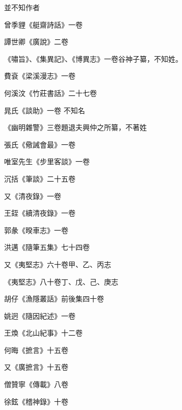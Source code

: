 \begin{pinyinscope}
 並不知作者



 曾季貍《艇齋詩話》一卷



 譚世卿《廣說》二卷



 《嘯旨》、《集異記》、《博異志》一卷谷神子纂，不知姓。



 費袞《梁溪漫志》一卷



 何溪汶《竹莊書話》二十七卷



 晁氏《談助》一卷
 不知名



 《幽明雜警》三卷題退夫興仲之所纂，不著姓



 張氏《儆誡會最》一卷



 唯室先生《步里客談》一卷



 沉括《筆談》二十五卷



 又《清夜錄》一卷



 王銍《續清夜錄》一卷



 郭彖《暌車志》一卷



 洪邁《隨筆五集》七十四卷



 又《夷堅志》六十卷甲、乙、丙志



 《夷堅志》八十卷丁、戊、己、庚志



 胡仔《漁隱叢話》前後集四十卷



 姚迥《隨因紀述》一卷



 王煥《北山紀事》十二卷



 何晦《摭言》十五卷



 又《廣摭言》十五卷



 僧贊寧《傳載》八卷



 徐鉉《稽神錄》十卷




\end{pinyinscope}
